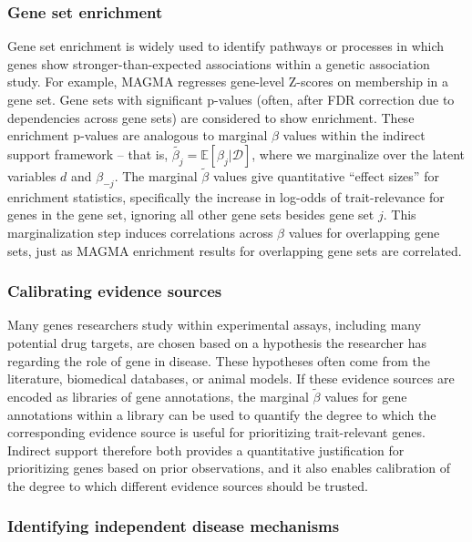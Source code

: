 \documentclass[11pt]{article}
\begin{document}
\subsubsection{Gene set enrichment}
Gene set enrichment is widely used to identify pathways or processes
in which genes show stronger-than-expected associations within a
genetic association study. For example, MAGMA regresses gene-level
Z-scores on membership in a gene set. Gene sets with significant
p-values (often, after FDR correction due to dependencies across gene
sets) are considered to show enrichment. These enrichment p-values are
analogous to marginal $\beta$ values within the indirect support
framework -- that is, $\tilde{\beta_j} = \mathbb{E}\left[\beta_j|\mathcal{D}\right]$, where we
marginalize over the latent variables $d$ and $\beta_{-j}$. The
marginal $\tilde{\beta}$ values give quantitative ``effect sizes'' for
enrichment statistics, specifically the increase in log-odds of
trait-relevance for genes in the gene set, ignoring all other gene
sets besides gene set $j$. This marginalization step induces
correlations across $\beta$ values for overlapping gene sets, just as
MAGMA enrichment results for 
overlapping gene sets are correlated.

\subsubsection{Calibrating evidence sources}
Many genes researchers study within experimental assays, including
many potential drug targets, are chosen based on a hypothesis the
researcher has regarding the role of gene in disease. These hypotheses
often come from the literature, biomedical
databases, or animal models. If these evidence sources are encoded as
libraries of gene annotations, the marginal $\tilde{\beta}$ values for gene annotations
within a library can be used to quantify the degree to which the
corresponding evidence source is useful for prioritizing
trait-relevant genes. Indirect support therefore both provides a
quantitative justification for prioritizing genes based on prior
observations, and it also enables calibration of the degree to which
different evidence sources should be trusted.

\subsubsection{Identifying independent disease mechanisms}
\end{document}
